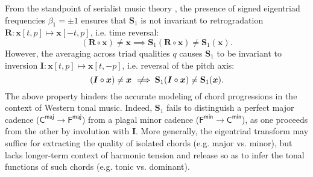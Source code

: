 \documentclass{article}
\makeatletter
\def\eg{e.g.\@\xspace}
\def\ie{i.e.\@\xspace}
\def\vs{vs.\@\xspace}
\makeatother
\begin{document}
From the standpoint of serialist music theory \cite{babbitt1960quarterly}, the presence of signed eigentriad frequencies $\beta_1 = \pm 1$ ensures that $\mathbf{S}_1$
is not invariant to retrogradation $\boldsymbol{R}: \boldsymbol{x}[t,p] \mapsto \boldsymbol{x}[-t,p]$, \ie{} time reversal:
\begin{equation}
(\boldsymbol{R} \circ \boldsymbol{x}) \neq \boldsymbol{x} \implies
\mathbf{S}_1 (\boldsymbol{R} \circ \boldsymbol{x}) \neq \mathbf{S}_1 (\boldsymbol{x}).
\end{equation}
However, the averaging across triad qualities $q$ causes $\mathbf{S}_1$ to be invariant to inversion
$\boldsymbol{I} : \boldsymbol{x}[t,p] \mapsto \boldsymbol{x}[t,-p]$, \ie{} reversal of the pitch axis:
\begin{equation}
(\boldsymbol{I} \circ \boldsymbol{x}) \neq \boldsymbol{x} \;\;\not\!\!\!\implies
\mathbf{S}_1 (\boldsymbol{I} \circ \boldsymbol{x}) \neq \mathbf{S}_1 (\boldsymbol{x}).
\end{equation}
The above property hinders the accurate modeling of chord progressions in the context of Western tonal music.
Indeed, $\mathbf{S}_1$ fails to distinguish a perfect major cadence ($\mathsf{C}^{\mathsf{maj}}\rightarrow\mathsf{F}^{\mathsf{maj}}$) from a plagal minor cadence ($\mathsf{F}^{\mathsf{min}} \rightarrow \mathsf{C}^{\mathsf{min}}$), as one proceeds from the other by involution with $\mathbf{I}$.
More generally, the eigentriad transform may suffice for extracting the quality of isolated chords (\eg{} major \vs{} minor), but lacks longer-term context of harmonic tension and release so as to infer the tonal functions of such chords (\eg{} tonic \vs{} dominant).
\end{document}
